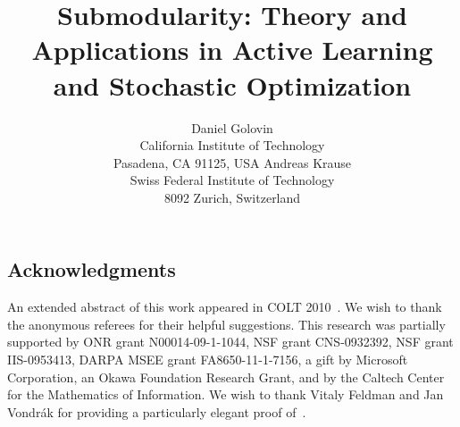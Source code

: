 \documentclass[11pt]{article}
\newcommand{\ourtitle}{\Term Submodularity: Theory and Applications in
  Active Learning and Stochastic Optimization}
\newcommand{\citep}[1]{{\cite{#1}}}
\begin{document}
%
  \title{\ourtitle}
  \author{
     \name \!Daniel Golovin  
     \\
     \addr California Institute of Technology\\
     Pasadena, CA 91125, USA
    \AND
     \name Andreas Krause 
     \\                    
     \addr Swiss Federal Institute of Technology\\
     8092 Zurich, Switzerland 
     }

%

\maketitle

%
%




%
%
%
%




%

%

%

%

%

%


%

%

%

%

%

%

%

%

%

%


%

%

%

%

%

%

%

%

%

%


%
\subsection*{Acknowledgments}
An extended abstract of this work appeared in COLT 2010~\citep{golovin10colt}. We wish to thank the anonymous referees for their helpful suggestions. 
This research was partially supported by ONR grant N00014-09-1-1044,
NSF grant CNS-0932392, NSF grant IIS-0953413, DARPA MSEE grant FA8650-11-1-7156, a gift by Microsoft Corporation, an Okawa Foundation Research Grant, and by the Caltech Center for the Mathematics of Information. We wish to thank Vitaly Feldman and Jan Vondr\'{a}k for providing a particularly elegant proof of~.
%


%
\appendix

%
%
\vskip 0.2in


\end{document}
